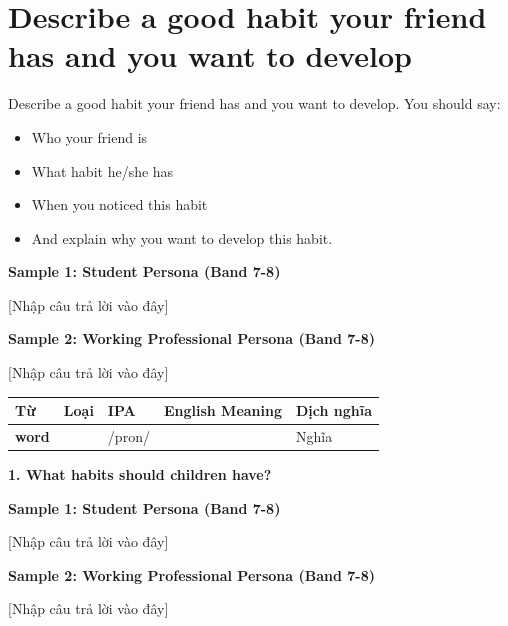 \section{Describe a good habit your friend has and you want to develop}
\begin{ieltsprompt}
Describe a good habit your friend has and you want to develop.
You should say:
\begin{itemize}[leftmargin=2em, itemsep=2pt]
\item Who your friend is
\item What habit he/she has
\item When you noticed this habit
\item And explain why you want to develop this habit.
\end{itemize}
\end{ieltsprompt}
\begin{ieltsanswer}
\textbf{Sample 1: Student Persona (Band 7-8)}

[Nhập câu trả lời vào đây]

\textbf{Sample 2: Working Professional Persona (Band 7-8)}

[Nhập câu trả lời vào đây]
\end{ieltsanswer}


\vspace{0.8em}
\begin{center}
\renewcommand{\arraystretch}{1.65}
\begin{tabularx}{\textwidth}{|V{0.22\textwidth}|C{0.07\textwidth}|I{0.20\textwidth}|Y|V{0.18\textwidth}|}
\hline
{}
\textbf{Từ} & \textbf{Loại} & \textbf{IPA} & \textbf{English Meaning} & \textbf{Dịch nghĩa} \\
\hline
\textbf{word} & & /pron/ & & Nghĩa \\ \hline
\end{tabularx}
\end{center}

\partthreeheader

\begin{ieltsquestion}
\textbf{1. What habits should children have?}
\end{ieltsquestion}
\textbf{Sample 1: Student Persona (Band 7-8)}

[Nhập câu trả lời vào đây]

\textbf{Sample 2: Working Professional Persona (Band 7-8)}

[Nhập câu trả lời vào đây]

